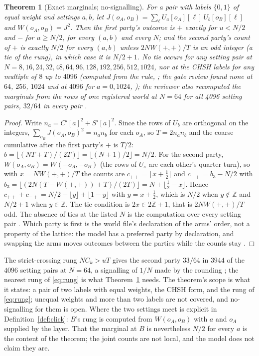\documentclass[11pt]{article}
\newtheorem{theorem}{Theorem}
\theoremstyle{definition}
\newcommand{\Z}{\mathbb{Z}}
\newcommand{\rung}{b}
\begin{document}
\begin{theorem}[Exact marginals; no-signalling]\label{th:marginals}
For a pair with labels $\{0, 1\}$ of equal weight and settings $a, b$, let
$J(o_A, o_B) = \sum_\ell U_a[o_A][\ell]\,U_b[o_B][\ell]$ and
$W(o_A, o_B) = J^2$. Then the first party's outcome is $+$ exactly for
$u < N/2$ and $-$ for $u \ge N/2$, for every $(a, b)$ and every $N$; and
the second party's count of $+$ is exactly $N/2$ for every $(a, b)$ unless
$2N W(+,+)/T$ is an odd integer (a tie of the rung), in which case it is
$N/2 + 1$. No tie occurs for any setting pair at $N = 8, 16, 24, 32, 48,
64, 96, 128, 192, 256, 512, 1024$, nor at the CHSH labels for any
multiple of $8$ up to $4096$ (computed from the rule, \cite{checks}; the
gate review found none at $64$, $256$, $1024$ and at $4096$ for
$a = 0, 1024$, \cite{log}); the
reviewer also recomputed the marginals from the rows of one registered
world at $N = 64$ for all 4096 setting pairs, $32/64$ in every pair
\cite{log}.
\end{theorem}
\begin{proof}
Write $n_a = C'[a]^2 + S'[a]^2$. Since the rows of $U_b$ are orthogonal on
the integers, $\sum_{o_B} J(o_A, o_B)^2 = n_a n_b$ for each $o_A$, so
$T = 2n_a n_b$ and the coarse cumulative after the first party's $+$ is
$T/2$: $\rung = \lfloor (NT + T)/(2T)\rfloor = \lfloor (N+1)/2 \rfloor =
N/2$. For the second party, $W(o_A, o_B) = W(-o_A, -o_B)$ (the rows of
$U_s$ are each other's quarter turn), so with $x = N W(+,+)/T$ the counts
are $c_{++} = \lfloor x + \tfrac12\rfloor$ and $c_{-+} = \rung_3 - N/2$ with
$\rung_3 = \lfloor (2N(T - W(+,+)) + T)/(2T)\rfloor = N + \lfloor \tfrac12 -
x\rfloor$. Hence $c_{++} + c_{-+} = N/2 + \lfloor y\rfloor + \lfloor 1 -
y\rfloor$ with $y = x + \tfrac12$, which is $N/2$ when $y \notin \Z$ and
$N/2 + 1$ when $y \in \Z$. The tie condition is $2x \in 2\Z + 1$, that
is $2NW(+,+)/T$ odd. The absence of ties at the listed $N$ is the
computation over every setting pair \cite{checks}. Which party is first
is the world file's declaration of the arms' order, not a property of
the lattice: the model has a preferred party by declaration, and
swapping the arms moves outcomes between the parties while the counts
stay \cite{log}.
\end{proof}

The strict-crossing rung $NC_k > uT$ gives the second party $33/64$ in
$3944$ of the $4096$ setting pairs at $N = 64$, a signalling of $1/N$ made
by the rounding \cite{design}; the nearest rung of \eqref{eq:rung} is what
Theorem~\ref{th:marginals} needs. The theorem's scope is what it states:
a pair of two labels with equal weights, the CHSH form, and the rung of
\eqref{eq:rung}; unequal weights and more than two labels are not covered,
and no-signalling for them is open. Where the two settings meet is
explicit in Definition~\ref{def:click}: $B$'s rung is computed from
$W(o_A, o_B)$ with $a$ and $o_A$ supplied by the layer. That the marginal
at $B$ is nevertheless $N/2$ for every $a$ is the content of the theorem;
the joint counts are not local, and the model does not claim they are.
\end{document}
